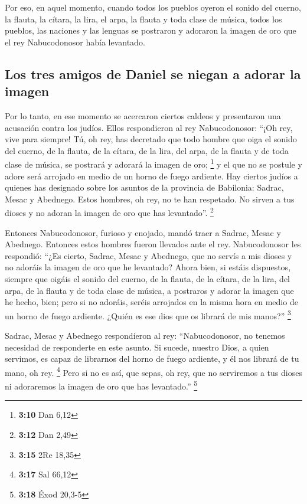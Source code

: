  Por eso, en aquel momento, cuando todos los pueblos
oyeron el sonido del cuerno, la flauta, la cítara, la lira, el arpa, la
flauta y toda clase de música, todos los pueblos, las naciones y las
lenguas se postraron y adoraron la imagen de oro que el rey
Nabucodonosor había levantado.

\hypertarget{los-tres-amigos-de-daniel-se-niegan-a-adorar-la-imagen}{%
\subsection{Los tres amigos de Daniel se niegan a adorar la
imagen}\label{los-tres-amigos-de-daniel-se-niegan-a-adorar-la-imagen}}

 Por lo tanto, en ese momento se acercaron ciertos caldeos
y presentaron una acusación contra los judíos.  Ellos
respondieron al rey Nabucodonosor: ``¡Oh rey, vive para siempre!
 Tú, oh rey, has decretado que todo hombre que oiga el
sonido del cuerno, de la flauta, de la cítara, de la lira, del arpa, de
la flauta y de toda clase de música, se postrará y adorará la imagen de
oro; \footnote{\textbf{3:10} Dan 6,12}  y el que no se
postule y adore será arrojado en medio de un horno de fuego ardiente.
 Hay ciertos judíos a quienes has designado sobre los
asuntos de la provincia de Babilonia: Sadrac, Mesac y Abednego. Estos
hombres, oh rey, no te han respetado. No sirven a tus dioses y no adoran
la imagen de oro que has levantado''. \footnote{\textbf{3:12} Dan 2,49}

 Entonces Nabucodonosor, furioso y enojado, mandó traer a
Sadrac, Mesac y Abednego. Entonces estos hombres fueron llevados ante el
rey.  Nabucodonosor les respondió: ``¿Es cierto, Sadrac,
Mesac y Abednego, que no servís a mis dioses y no adoráis la imagen de
oro que he levantado?  Ahora bien, si estáis dispuestos,
siempre que oigáis el sonido del cuerno, de la flauta, de la cítara, de
la lira, del arpa, de la flauta y de toda clase de música, a postraros y
adorar la imagen que he hecho, bien; pero si no adoráis, seréis
arrojados en la misma hora en medio de un horno de fuego ardiente.
¿Quién es ese dios que os librará de mis manos?'' \footnote{\textbf{3:15}
  2Re 18,35}

 Sadrac, Mesac y Abednego respondieron al rey:
``Nabucodonosor, no tenemos necesidad de responderte en este asunto.
 Si sucede, nuestro Dios, a quien servimos, es capaz de
librarnos del horno de fuego ardiente, y él nos librará de tu mano, oh
rey. \footnote{\textbf{3:17} Sal 66,12}  Pero si no es
así, que sepas, oh rey, que no serviremos a tus dioses ni adoraremos la
imagen de oro que has levantado.'' \footnote{\textbf{3:18} Éxod 20,3-5}

